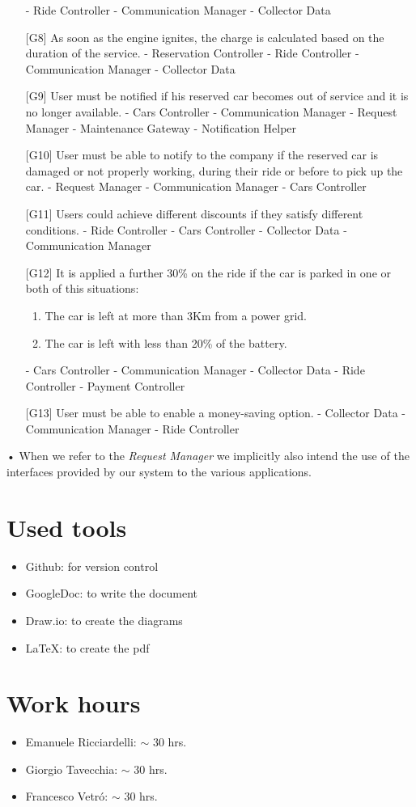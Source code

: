 \documentclass[10pt, a4paper,titlepage]{article}
\begin{document}
\begin{itemize}
\subitem - Ride Controller
\subitem - Communication Manager
\subitem - Collector Data
\item[{[G8]}] As soon as the engine ignites, the charge is calculated based on the duration of the service.
\subitem - Reservation Controller
\subitem - Ride Controller
\subitem - Communication Manager
\subitem - Collector Data
\item[{[G9]}] User must be notified if his reserved car becomes out of service and it is no longer available.
\subitem - Cars Controller
\subitem - Communication Manager
\subitem - Request Manager
\subitem - Maintenance Gateway
\subitem - Notification Helper
\item[{[G10]}] User must be able to notify to the company if the reserved car is damaged or not properly working, during their ride or before to pick up the car.
\subitem - Request Manager
\subitem - Communication Manager
\subitem - Cars Controller
\item[{[G11]}] Users could achieve different discounts if they satisfy different conditions.
\subitem - Ride Controller
\subitem - Cars Controller
\subitem - Collector Data
\subitem - Communication Manager
\item[{[G12]}] It is applied a further 30\% on the ride if the car is parked in one or both of this situations:
\begin{enumerate}
\item The car is left at more than 3Km from a power grid.
\item The car is left with less than 20\% of the battery.
\end{enumerate}
\subitem - Cars Controller
\subitem - Communication Manager
\subitem - Collector Data
\subitem - Ride Controller
\subitem - Payment Controller
\item[{[G13]}] User must be able to enable a money-saving option.
\subitem - Collector Data
\subitem - Communication Manager
\subitem - Ride Controller
\end{itemize}•
When we refer to the \emph{Request Manager} we implicitly also intend the use of the interfaces provided by our system to the various applications.
\section*{Used tools}
\begin{itemize}
\item Github: for version control
\item GoogleDoc: to write the document
\item Draw.io: to create the diagrams
\item \LaTeX: to create the pdf
\end{itemize}
\section*{Work hours} 
\begin{itemize}
\item Emanuele Ricciardelli: $\sim$ 30 hrs.
\item Giorgio Tavecchia: $\sim$ 30 hrs.
\item Francesco Vetr\'o: $\sim$ 30 hrs.
\end{itemize}
\enddocument
\end{document}
